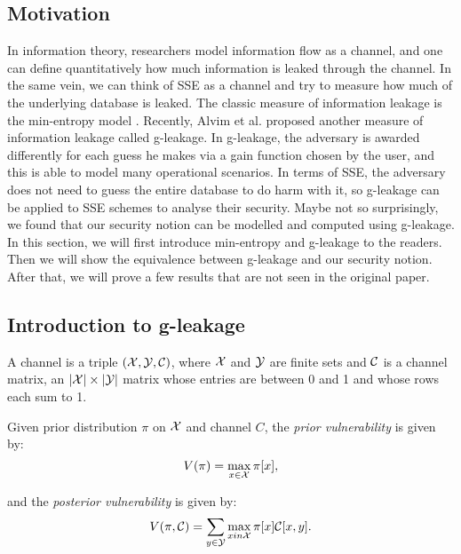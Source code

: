 \subsection{Motivation}
In information theory, researchers model information flow as a channel, and one can define quantitatively how much information is leaked through the channel. In the same vein, we can think of SSE as a channel and try to measure how much of the underlying database is leaked. The classic measure of information leakage is the min-entropy model \cite{mathai1975basic}. Recently, Alvim et al. \cite{6266165} proposed another measure of information leakage called g-leakage. In g-leakage, the adversary is awarded differently for each guess he makes via a gain function chosen by the user, and this is able to model many operational scenarios. In terms of SSE, the adversary does not need to guess the entire database to do harm with it, so g-leakage can be applied to SSE schemes to analyse their security. Maybe not so surprisingly, we found that our security notion can be modelled and computed using g-leakage. In this section, we will first introduce min-entropy and g-leakage to the readers. Then we will show the equivalence between g-leakage and our security notion. After that, we will prove a few results that are not seen in the original paper.



\subsection{Introduction to g-leakage}
\begin{definition}
	A channel is a triple $(\mathcal{X}, \mathcal{Y}, \mathcal{C})$, where $\mathcal{X}$ and $\mathcal{Y}$ are finite sets and $\mathcal{C}$ is a channel matrix, an $|\mathcal{X}| \times |\mathcal{Y}|$ matrix whose entries are between 0 and 1 and whose rows each sum to 1. 
\end{definition}


\begin{definition}[Vulnerabilities]
	Given prior distribution $\pi$ on $\mathcal{X}$ and channel $C$, the \textit{prior vulnerability} is given by:
	\begin{equation}
	V(\pi) = \max_{x \in \mathcal{X}} \pi [x],
	\end{equation}
	
	and the \textit{posterior vulnerability} is given by:
	\begin{equation}
	V(\pi, \mathcal{C}) = \sum_{y \in \mathcal{Y}} \max_{x in \mathcal{X}} \pi [x] \mathcal{C} [x,y].
	\end{equation}
\end{definition}


